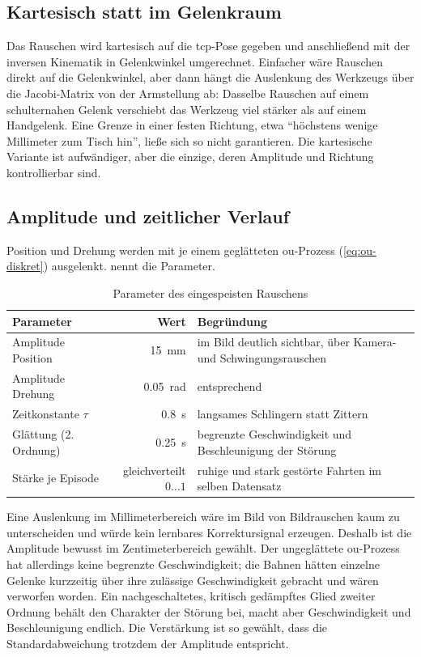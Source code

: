 \subsection{Kartesisch statt im Gelenkraum}

Das Rauschen wird kartesisch auf die \ac{tcp}-Pose gegeben und anschließend mit der inversen
Kinematik in Gelenkwinkel umgerechnet. Einfacher wäre Rauschen direkt auf die Gelenkwinkel,
aber dann hängt die Auslenkung des Werkzeugs über die Jacobi-Matrix von der Armstellung ab:
Dasselbe Rauschen auf einem schulternahen Gelenk verschiebt das Werkzeug viel stärker als auf
einem Handgelenk. Eine Grenze in einer festen Richtung, etwa \enquote{höchstens wenige
Millimeter zum Tisch hin}, ließe sich so nicht garantieren. Die kartesische Variante ist
aufwändiger, aber die einzige, deren Amplitude und Richtung kontrollierbar sind.

\subsection{Amplitude und zeitlicher Verlauf}

Position und Drehung werden mit je einem geglätteten \ac{ou}-Prozess
(\cref{eq:ou-diskret}) ausgelenkt.  nennt die Parameter.

\begin{table}[htbp]
  \centering
  \caption{Parameter des eingespeisten Rauschens}
  \label{tab:rauschen}
  \begin{tabularx}{\textwidth}{@{}l r X@{}}
    \toprule
    Parameter & Wert & Begründung \\
    \midrule
    Amplitude Position & \SI{15}{\milli\metre} & im Bild deutlich sichtbar, über Kamera-
      und Schwingungsrauschen \\
    Amplitude Drehung & \SI{0.05}{rad} & entsprechend \\
    Zeitkonstante $\tau$ & \SI{0.8}{\second} & langsames Schlingern statt Zittern \\
    Glättung (2.\,Ordnung) & \SI{0.25}{\second} & begrenzte Geschwindigkeit und
      Beschleunigung der Störung \\
    Stärke je Episode & gleichverteilt $0 \dots 1$ & ruhige und stark gestörte Fahrten
      im selben Datensatz \\
    \bottomrule
  \end{tabularx}
\end{table}

Eine Auslenkung im Millimeterbereich wäre im Bild von Bildrauschen kaum zu unterscheiden und
würde kein lernbares Korrektursignal erzeugen. Deshalb ist die Amplitude bewusst im
Zentimeterbereich gewählt. Der ungeglättete \ac{ou}-Prozess hat allerdings keine begrenzte
Geschwindigkeit; die Bahnen hätten einzelne Gelenke kurzzeitig über ihre zulässige
Geschwindigkeit gebracht und wären verworfen worden. Ein nachgeschaltetes, kritisch
gedämpftes Glied zweiter Ordnung behält den Charakter der Störung bei, macht aber
Geschwindigkeit und Beschleunigung endlich. Die Verstärkung ist so gewählt, dass die
Standardabweichung trotzdem der Amplitude entspricht.


